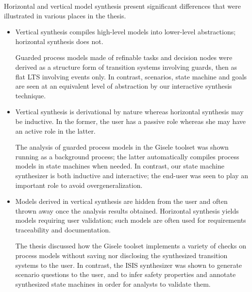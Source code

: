 Horizontal and vertical model synthesis present significant differences that were illustrated in various places in the thesis.
\begin{itemize}
\item Vertical synthesis compiles high-level models into lower-level abstractions; horizontal synthesis does not. 

Guarded process models made of refinable tasks and decision nodes were derived as a structure form of transition systems involving guards, then as flat LTS involving events only. In contrast, scenarios, state machine and goals are seen at an equivalent level of abstraction by our interactive synthesis technique.

\item Vertical synthesis is derivational by nature whereas horizontal synthesis may be inductive. In the former, the user has a passive role whereas she may have an active role in the latter.

The analysis of guarded process models in the Gisele toolset was shown running as a background process; the latter automatically compiles process models in state machines when needed. In contrast, our state machine synthesizer is both inductive and interactive; the end-user was seen to play an important role to avoid overgeneralization.

\item Models derived in vertical synthesis are hidden from the user and often thrown away once the analysis results obtained. Horizontal synthesis yields models requiring user validation; such models are often used for requirements traceability and documentation.

The thesis discussed how the Gisele toolset implements a variety of checks on process models without saving nor disclosing the synthesized transition systems to the user. In contrast, the ISIS synthesizer was shown to generate scenario questions to the user, and to infer safety properties and annotate synthesized state machines in order for analysts to validate them.

\end{itemize}



